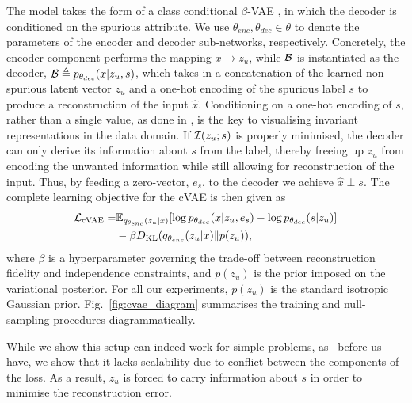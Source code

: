 The model takes the form of a class conditional $\beta$-\acs{VAE} \citep{higgins2017beta}, in which the
decoder is conditioned on the spurious attribute. 
%
We use $\theta_{enc}, \theta_{dec} \in \theta$ to denote the parameters of the encoder and decoder
sub-networks, respectively. 
%
Concretely, the encoder component performs the mapping $x \to{z_u}$, while ${\mathcal{B}}$ is instantiated as
the decoder, ${\mathcal{B}} \triangleq p_{\theta_{dec}}(x|z_u, s)$, which takes in a concatenation of the
learned non-spurious latent vector $z_u$ and a one-hot encoding of the spurious label $s$ to
produce a reconstruction of the input $\hat{x}$. 
%
Conditioning on a one-hot encoding of $s$, rather than a single value, as done in
\citet{madras2018learning}, is the key to visualising invariant representations in the data domain.
%
If ${\mathcal{I}}(z_u; s)$ is properly minimised, the decoder can only derive its information about $s$ from
the label, thereby freeing up $z_u$ from encoding the unwanted information while still allowing for
reconstruction of the input.
%
Thus, by feeding a zero-vector, \(e_s\), to the decoder we achieve $\hat{x} \perp s$. 
%
The complete learning objective for the \ac{cVAE} is then given as
%
\begin{align}
%
\begin{split}
    \gL_{\mathrm{cVAE}} =& 
    \E_{q_{\theta_{enc}}(z_u|x)}[
    \log
    p_{\theta_{dec}}(x|z_u, e_s) - \log p_{\theta_{dec}}(s|z_u)
    ] \\ &- \beta \KL(q_{\theta_{enc}}(z_u |x) \| p(z_u)),
\end{split}
%
\label{eq:cvae-obj}
\end{align}
%
where $\beta$ is a hyperparameter governing the trade-off between reconstruction fidelity and
independence constraints, and $p(z_u)$ is the prior imposed on the variational posterior. 
%
For all our experiments, $p(z_u)$ is the standard isotropic Gaussian prior.
%
Fig.~\ref{fig:cvae_diagram} summarises the training and null-sampling procedures diagrammatically.

While we show this setup can indeed work for simple problems, as~\citet{madras2018learning} before
us have, we show that it lacks scalability due to conflict between the components of the loss.
%
%
As a result, $z_u$ is forced to carry information about $s$ in order to minimise the
reconstruction error. 

